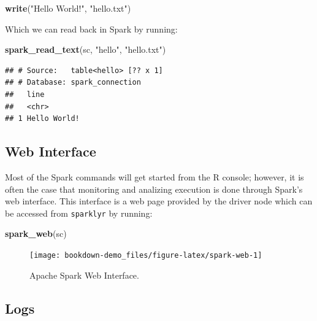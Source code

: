 \documentclass[]{book}
\newenvironment{Shaded}{\begin{snugshade}}{\end{snugshade}}
\newcommand{\KeywordTok}[1]{\textcolor[rgb]{0.13,0.29,0.53}{\textbf{#1}}}
\newcommand{\StringTok}[1]{\textcolor[rgb]{0.31,0.60,0.02}{#1}}
\newcommand{\NormalTok}[1]{#1}
\theoremstyle{definition}
\theoremstyle{definition}
\theoremstyle{definition}
\theoremstyle{remark}
\begin{document}
\begin{Shaded}
\begin{Highlighting}[]
\KeywordTok{write}\NormalTok{(}\StringTok{"Hello World!"}\NormalTok{, }\StringTok{"hello.txt"}\NormalTok{)}
\end{Highlighting}
\end{Shaded}

Which we can read back in Spark by running:

\begin{Shaded}
\begin{Highlighting}[]
\KeywordTok{spark_read_text}\NormalTok{(sc, }\StringTok{"hello"}\NormalTok{, }\StringTok{"hello.txt"}\NormalTok{)}
\end{Highlighting}
\end{Shaded}

\begin{verbatim}
## # Source:   table<hello> [?? x 1]
## # Database: spark_connection
##   line        
##   <chr>       
## 1 Hello World!
\end{verbatim}

\subsection{Web Interface}\label{web-interface}

Most of the Spark commands will get started from the R console; however,
it is often the case that monitoring and analizing execution is done
through Spark's web interface. This interface is a web page provided by
the driver node which can be accessed from \texttt{sparklyr} by running:

\begin{Shaded}
\begin{Highlighting}[]
\KeywordTok{spark_web}\NormalTok{(sc)}
\end{Highlighting}
\end{Shaded}

\begin{figure}

{\centering \texttt{[image: bookdown-demo\_files/figure-latex/spark-web-1]} 

}

\caption{Apache Spark Web Interface.}\label{fig:spark-web}
\end{figure}

\subsection{Logs}\label{logs}
\end{document}
